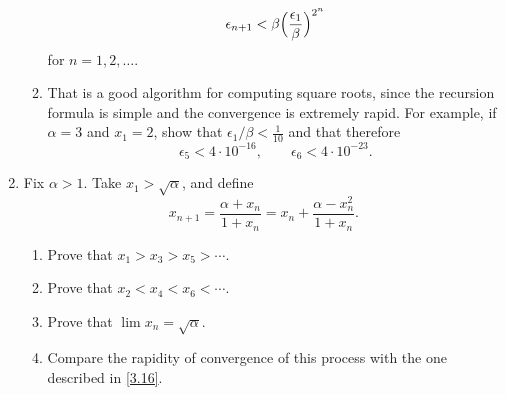 \begin{enumerate}
\begin{enumerate}[label = (\alph*)]
    \[
    \epsilon_{n + 1} < \beta\Bigl(\frac{\epsilon_1}{\beta}\Bigr)^{2^n}
    \]
    for \(n = 1,2,\ldots\).
  \item
    That is a good algorithm for computing square roots, since the recursion
    formula is simple and the convergence is extremely rapid.
    For example, if \(\alpha = 3\) and \(x_1 = 2\), show that
    \(\epsilon_1/\beta < \frac{1}{10}\) and that therefore
    \[
    \epsilon_5 < 4\cdot 10^{-16},\qquad\epsilon_6 < 4\cdot 10^{-23}.
    \]
  \end{enumerate}
\item
  Fix \(\alpha > 1\).
  Take \(x_1 > \sqrt{\alpha}\), and define
  \[
  x_{n + 1} = \frac{\alpha + x_n}{1 + x_n} = x_n +
  \frac{\alpha - x_n^2}{1 + x_n}.
  \]
  \begin{enumerate}[label = (\alph*)]
  \item
    Prove that \(x_1 > x_3 > x_5 > \cdots\).
  \item
    Prove that \(x_2 < x_4 < x_6 < \cdots\).
  \item
    Prove that \(\lim x_n = \sqrt{\alpha}\).
  \item
    Compare the rapidity of convergence of this process with the one described
    in \cref{3.16}.
  \end{enumerate}
\end{enumerate}
